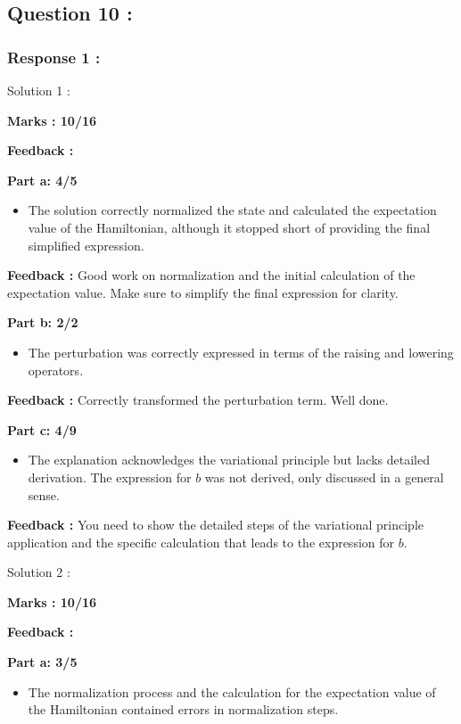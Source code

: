\documentclass[a4paper,11pt]{article}
\begin{document}
\subsection*{Question 10 :}

\subsubsection*{Response 1 :}

Solution 1 :

\textbf{Marks : 10/16}

\textbf{Feedback :}

\textbf{Part a: 4/5}
\begin{itemize}
    \item The solution correctly normalized the state and calculated the expectation value of the Hamiltonian, although it stopped short of providing the final simplified expression.
\end{itemize}

\textbf{Feedback :}
Good work on normalization and the initial calculation of the expectation value. Make sure to simplify the final expression for clarity.


\textbf{Part b: 2/2}
\begin{itemize}
    \item The perturbation was correctly expressed in terms of the raising and lowering operators.
\end{itemize}

\textbf{Feedback :}
Correctly transformed the perturbation term. Well done.


\textbf{Part c: 4/9}
\begin{itemize}
    \item The explanation acknowledges the variational principle but lacks detailed derivation. The expression for $b$ was not derived, only discussed in a general sense.
\end{itemize}

\textbf{Feedback :}
You need to show the detailed steps of the variational principle application and the specific calculation that leads to the expression for $b$.


Solution 2 :

\textbf{Marks : 10/16}

\textbf{Feedback :}

\textbf{Part a: 3/5}
\begin{itemize}
    \item The normalization process and the calculation for the expectation value of the Hamiltonian contained errors in normalization steps.
\end{itemize}
\end{document}
